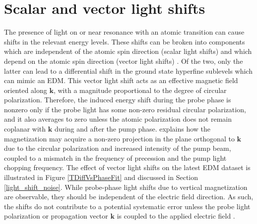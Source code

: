 \documentclass [10pt, twoside] {uwthesis}[2012/04/02]
\begin{document}
\section{Scalar and vector light shifts}
The presence of light on or near resonance with an atomic transition can cause shifts in the relevant energy levels. These shifts can be broken into components which are independent of the atomic spin direction (scalar light shifts) and which depend on the atomic spin direction (vector light shifts) \cite{Swallows, 1967_Optical_pumping_light_shifts}. Of the two, only the latter can lead to a differential shift in the ground state hyperfine sublevels which can mimic an EDM. This vector light shift acts as an effective magnetic field oriented along $\mathbf{k}$, with a magnitude proportional to the degree of circular polarization. Therefore, the induced energy shift during the probe phase is nonzero only if the probe light has some non-zero residual circular polarization, and it also averages to zero unless the atomic polarization does not remain coplanar with $\mathbf{k}$ during and after the pump phase. \cite{Swallows} explains how the magnetization may acquire a non-zero projection in the plane orthogonal to $\mathbf{k}$ due to the circular polarization and increased intensity of the pump beam, coupled to a mismatch in the  frequency of precession and the pump light chopping frequency. The effect of vector light shifts on the latest EDM dataset is illustrated in Figure \ref{TDiffVsPhaseFit} and discussed in Section \ref{light_shift_noise}. While probe-phase light shifts due to vertical magnetization are observable, they should be independent of the electric field direction. As such, the shifts do not contribute to a potential systematic error unless the probe light polarization or propagation vector $\mathbf{k}$ is coupled to the applied electric field \cite{Griffith}. 
\end{document}
